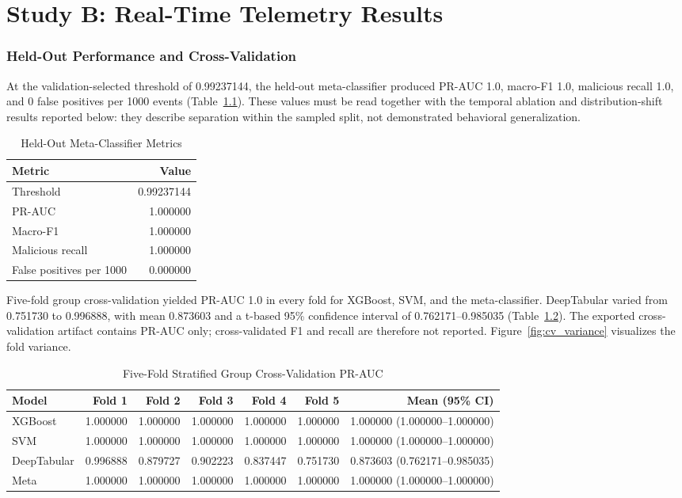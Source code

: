 \chapter{Study B: Real-Time Telemetry Results}
\label{ch:study_b_results}


\subsection{Held-Out Performance and Cross-Validation}
At the validation-selected threshold of 0.99237144, the held-out meta-classifier produced PR-AUC 1.0, macro-F1 1.0, malicious recall 1.0, and 0 false positives per 1000 events (Table~\ref{tab:heldout_metrics}). These values must be read together with the temporal ablation and distribution-shift results reported below: they describe separation within the sampled split, not demonstrated behavioral generalization.

\begin{table}[!htbp]
\caption{Held-Out Meta-Classifier Metrics}
\label{tab:heldout_metrics}
\centering
\begin{tabular}{lr}
\toprule
Metric & Value \\
\midrule
Threshold & 0.99237144 \\
PR-AUC & 1.000000 \\
Macro-F1 & 1.000000 \\
Malicious recall & 1.000000 \\
False positives per 1000 & 0.000000 \\
\bottomrule
\end{tabular}
\end{table}

Five-fold group cross-validation yielded PR-AUC 1.0 in every fold for XGBoost, SVM, and the meta-classifier. DeepTabular varied from 0.751730 to 0.996888, with mean 0.873603 and a t-based 95\% confidence interval of 0.762171--0.985035 (Table~\ref{tab:cv_results}). The exported cross-validation artifact contains PR-AUC only; cross-validated F1 and recall are therefore not reported. Figure~\ref{fig:cv_variance} visualizes the fold variance.

\begin{table}[!tbp]
\caption{Five-Fold Stratified Group Cross-Validation PR-AUC}
\label{tab:cv_results}
\centering
\begin{tabular}{lrrrrrr}
\toprule
Model & Fold 1 & Fold 2 & Fold 3 & Fold 4 & Fold 5 & Mean (95\% CI) \\
\midrule
XGBoost & 1.000000 & 1.000000 & 1.000000 & 1.000000 & 1.000000 & 1.000000 (1.000000--1.000000) \\
SVM & 1.000000 & 1.000000 & 1.000000 & 1.000000 & 1.000000 & 1.000000 (1.000000--1.000000) \\
DeepTabular & 0.996888 & 0.879727 & 0.902223 & 0.837447 & 0.751730 & 0.873603 (0.762171--0.985035) \\
Meta & 1.000000 & 1.000000 & 1.000000 & 1.000000 & 1.000000 & 1.000000 (1.000000--1.000000) \\
\bottomrule
\end{tabular}
\end{table}

